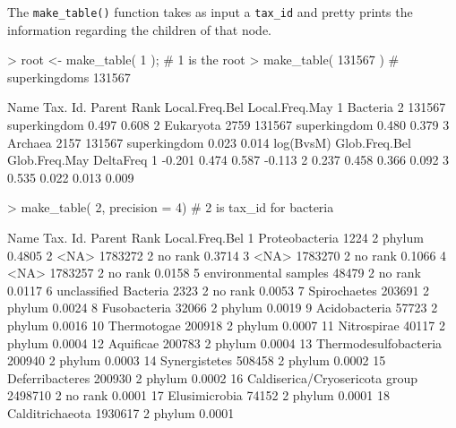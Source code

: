 \documentclass{article}
\begin{document}
The {\tt make\_table()} function takes as input a {\tt tax\_id} and pretty prints
the information regarding the children of that node.

\begin{Schunk}
\begin{Sinput}
> root <- make_table( 1 );   # 1 is the root
> make_table( 131567 ) # superkingdoms 131567
\end{Sinput}
\begin{Soutput}
       Name Tax. Id. Parent         Rank Local.Freq.Bel Local.Freq.May
1  Bacteria        2 131567 superkingdom          0.497          0.608
2 Eukaryota     2759 131567 superkingdom          0.480          0.379
3   Archaea     2157 131567 superkingdom          0.023          0.014
  log(BvsM) Glob.Freq.Bel Glob.Freq.May DeltaFreq
1    -0.201         0.474         0.587    -0.113
2     0.237         0.458         0.366     0.092
3     0.535         0.022         0.013     0.009
\end{Soutput}
\begin{Sinput}
> make_table( 2, precision = 4)  # 2 is tax_id for bacteria
\end{Sinput}
\begin{Soutput}
                             Name Tax. Id. Parent    Rank Local.Freq.Bel
1                  Proteobacteria     1224      2  phylum         0.4805
2                            <NA>  1783272      2 no rank         0.3714
3                            <NA>  1783270      2 no rank         0.1066
4                            <NA>  1783257      2 no rank         0.0158
5           environmental samples    48479      2 no rank         0.0117
6           unclassified Bacteria     2323      2 no rank         0.0053
7                    Spirochaetes   203691      2  phylum         0.0024
8                    Fusobacteria    32066      2  phylum         0.0019
9                   Acidobacteria    57723      2  phylum         0.0016
10                    Thermotogae   200918      2  phylum         0.0007
11                    Nitrospirae    40117      2  phylum         0.0004
12                      Aquificae   200783      2  phylum         0.0004
13          Thermodesulfobacteria   200940      2  phylum         0.0003
14                  Synergistetes   508458      2  phylum         0.0002
15                Deferribacteres   200930      2  phylum         0.0002
16 Caldiserica/Cryosericota group  2498710      2 no rank         0.0001
17                  Elusimicrobia    74152      2  phylum         0.0001
18                Calditrichaeota  1930617      2  phylum         0.0001

\end{Soutput}
\end{Schunk}
\end{document}
